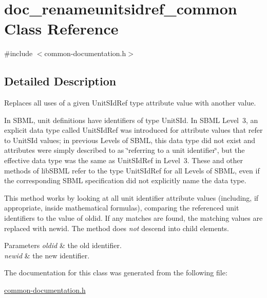 \hypertarget{classdoc__renameunitsidref__common}{}\section{doc\+\_\+renameunitsidref\+\_\+common Class Reference}
\label{classdoc__renameunitsidref__common}


{\ttfamily \#include $<$common-\/documentation.\+h$>$}



\subsection{Detailed Description}
Replaces all uses of a given {\ttfamily Unit\+S\+Id\+Ref} type attribute value with another value.

\begin{DoxyParagraph}{}
In S\+B\+ML, unit definitions have identifiers of type {\ttfamily Unit\+S\+Id}. In S\+B\+ML Level~3, an explicit data type called {\ttfamily Unit\+S\+Id\+Ref} was introduced for attribute values that refer to {\ttfamily Unit\+S\+Id} values; in previous Levels of S\+B\+ML, this data type did not exist and attributes were simply described to as \char`\"{}referring to a unit identifier\char`\"{}, but the effective data type was the same as {\ttfamily Unit\+S\+Id\+Ref} in Level~3. These and other methods of lib\+S\+B\+ML refer to the type {\ttfamily Unit\+S\+Id\+Ref} for all Levels of S\+B\+ML, even if the corresponding S\+B\+ML specification did not explicitly name the data type.
\end{DoxyParagraph}
This method works by looking at all unit identifier attribute values (including, if appropriate, inside mathematical formulas), comparing the referenced unit identifiers to the value of {\ttfamily oldid}. If any matches are found, the matching values are replaced with {\ttfamily newid}. The method does {\itshape not} descend into child elements.


\begin{DoxyParams}{Parameters}
{\em oldid} & the old identifier. \\
\hline
{\em newid} & the new identifier. \\
\hline
\end{DoxyParams}


The documentation for this class was generated from the following file\+:\begin{DoxyCompactItemize}
\item 
\hyperlink{common-documentation_8h}{common-\/documentation.\+h}\end{DoxyCompactItemize}
